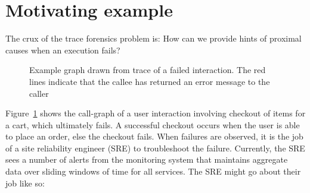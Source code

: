 \section{Motivating example}

The crux of the trace forensics problem is: How can we provide hints of proximal causes when an execution fails? 

\begin{figure}[h]
\caption{Example graph drawn from trace of a failed interaction. The red lines indicate that the callee has returned an error message to the caller}
\label{Failed_ex}
\end{figure}

Figure~\ref{Failed_ex} shows the  call-graph of a user interaction involving checkout of items for a cart, which ultimately fails. 
A successful checkout occurs when the user is able to place an order, else the checkout fails. 
When failures are observed, it is the job of a site reliability engineer (SRE) to troubleshoot the failure. 
Currently, the SRE sees a number of alerts  from the monitoring system that maintains aggregate data over sliding windows of time for all services.
The SRE might go about their job like so:
